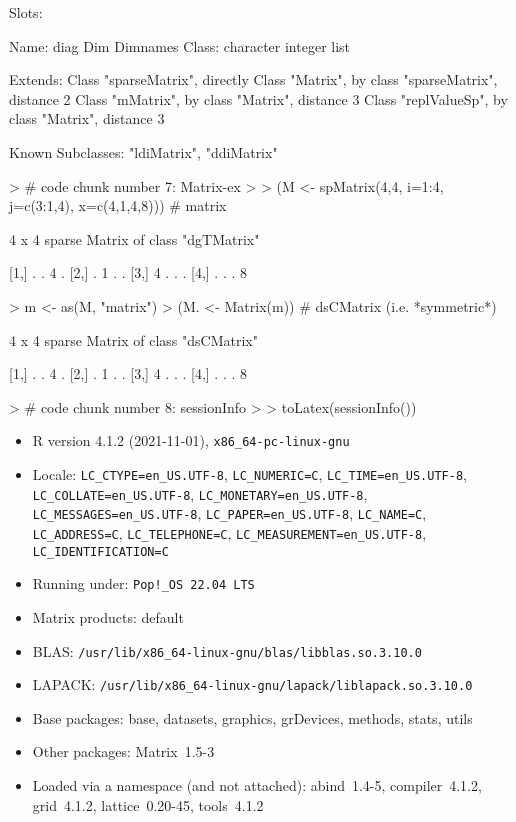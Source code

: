 \documentclass{article}
\begin{document}
\begin{Schunk}
\begin{Soutput}
Slots:
                                    
Name:       diag       Dim  Dimnames
Class: character   integer      list

Extends: 
Class "sparseMatrix", directly
Class "Matrix", by class "sparseMatrix", distance 2
Class "mMatrix", by class "Matrix", distance 3
Class "replValueSp", by class "Matrix", distance 3

Known Subclasses: "ldiMatrix", "ddiMatrix"
\end{Soutput}
\begin{Sinput}
> # code chunk number 7: Matrix-ex
> 
> (M <- spMatrix(4,4, i=1:4, j=c(3:1,4), x=c(4,1,4,8)))  # matrix
\end{Sinput}
\begin{Soutput}
4 x 4 sparse Matrix of class "dgTMatrix"
            
[1,] . . 4 .
[2,] . 1 . .
[3,] 4 . . .
[4,] . . . 8
\end{Soutput}
\begin{Sinput}
> m <- as(M, "matrix")
> (M. <- Matrix(m))  # dsCMatrix (i.e. *symmetric*)
\end{Sinput}
\begin{Soutput}
4 x 4 sparse Matrix of class "dsCMatrix"
            
[1,] . . 4 .
[2,] . 1 . .
[3,] 4 . . .
[4,] . . . 8
\end{Soutput}
\begin{Sinput}
> # code chunk number 8: sessionInfo
> 
> toLatex(sessionInfo())
\end{Sinput}
\begin{Soutput}
\begin{itemize}\raggedright
  \item R version 4.1.2 (2021-11-01), \verb|x86_64-pc-linux-gnu|
  \item Locale: \verb|LC_CTYPE=en_US.UTF-8|, \verb|LC_NUMERIC=C|, \verb|LC_TIME=en_US.UTF-8|, \verb|LC_COLLATE=en_US.UTF-8|, \verb|LC_MONETARY=en_US.UTF-8|, \verb|LC_MESSAGES=en_US.UTF-8|, \verb|LC_PAPER=en_US.UTF-8|, \verb|LC_NAME=C|, \verb|LC_ADDRESS=C|, \verb|LC_TELEPHONE=C|, \verb|LC_MEASUREMENT=en_US.UTF-8|, \verb|LC_IDENTIFICATION=C|
  \item Running under: \verb|Pop!_OS 22.04 LTS|
  \item Matrix products: default
  \item BLAS:   \verb|/usr/lib/x86_64-linux-gnu/blas/libblas.so.3.10.0|
  \item LAPACK: \verb|/usr/lib/x86_64-linux-gnu/lapack/liblapack.so.3.10.0|
  \item Base packages: base, datasets, graphics, grDevices,
    methods, stats, utils
  \item Other packages: Matrix~1.5-3
  \item Loaded via a namespace (and not attached): abind~1.4-5,
    compiler~4.1.2, grid~4.1.2, lattice~0.20-45, tools~4.1.2
\end{itemize}
\end{Soutput}
\end{Schunk}
\end{document}
